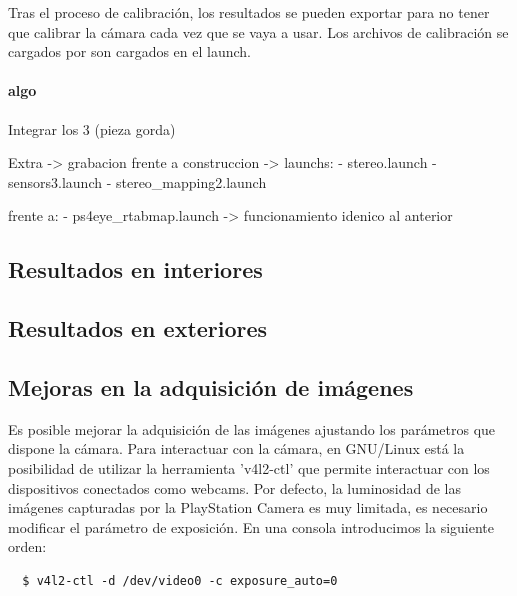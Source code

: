 Tras el proceso de calibración, los resultados se pueden exportar para no tener
que calibrar la cámara cada vez que se vaya a usar. Los archivos de calibración
se cargados por son cargados en el launch. %

\paragraph{algo} \hspace{0pt}



Integrar los 3 (pieza gorda)

Extra -> grabacion frente a construccion -> launchs:
  - stereo.launch
  - sensors3.launch
  - stereo\_mapping2.launch
  
frente a:
  - ps4eye\_rtabmap.launch -> funcionamiento idenico al anterior


\subsection{Resultados en interiores}



\subsection{Resultados en exteriores}

\subsection{Mejoras en la adquisición de imágenes}

Es posible mejorar la adquisición de las imágenes ajustando los parámetros que
dispone la cámara. Para interactuar con la cámara, en GNU/Linux está la
posibilidad de utilizar la herramienta 'v4l2-ctl' que permite interactuar con
los dispositivos conectados como webcams. Por defecto, la luminosidad de las
imágenes capturadas por la PlayStation Camera es muy limitada, es necesario
modificar el parámetro de exposición. En una consola introducimos la siguiente
orden:
\\
\begin{lstlisting}
  $ v4l2-ctl -d /dev/video0 -c exposure_auto=0
\end{lstlisting}

